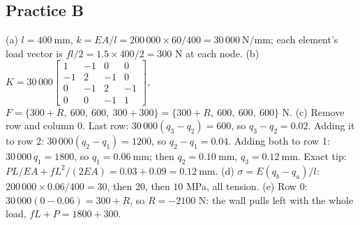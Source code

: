 \documentclass[11pt]{article}
\newcommand{\mm}{\ \mathrm{mm}}
\newcommand{\Nmm}{\ \mathrm{N/mm}}
\begin{document}
\subsection*{Practice B}
(a) $l = 400\mm$, $k = EA/l = 200\,000\times60/400 = 30\,000\Nmm$; each element's load vector is
$fl/2 = 1.5\times400/2 = 300$ N at each node.
(b) $K = 30\,000\begin{bmatrix}1&-1&0&0\\-1&2&-1&0\\0&-1&2&-1\\0&0&-1&1\end{bmatrix}$,
$F = \{300 + R,\ 600,\ 600,\ 300 + 300\} = \{300 + R,\ 600,\ 600,\ 600\}$ N.
(c) Remove row and column 0. Last row: $30\,000(q_3 - q_2) = 600$, so $q_3 - q_2 = 0.02$. Adding it to row 2:
$30\,000(q_2 - q_1) = 1200$, so $q_2 - q_1 = 0.04$. Adding both to row 1: $30\,000\,q_1 = 1800$, so $q_1 = 0.06\mm$;
then $q_2 = 0.10\mm$, $q_3 = 0.12\mm$. Exact tip: $PL/EA + fL^2/(2EA) = 0.03 + 0.09 = 0.12\mm$.
(d) $\sigma = E(q_b - q_a)/l$: $200\,000\times0.06/400 = 30$, then $20$, then $10$ MPa, all tension.
(e) Row 0: $30\,000(0 - 0.06) = 300 + R$, so $R = -2100$ N: the wall pulls left with the whole load,
$fL + P = 1800 + 300$.
\end{document}
